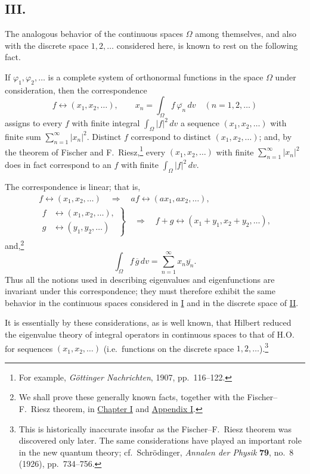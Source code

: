 ﻿\documentclass[paper=b5,fontsize=13pt,bookmarkpackage=false,twoside]{scrartcl}
\begin{document}
\subsection*{III.}\label{intro:III}

The analogous behavior of the continuous spaces $\Omega$ among themselves, and also with the discrete space $1,2,\ldots$ considered here, is known to rest on the following fact.

If $\varphi_1,\varphi_2,\ldots$ is a complete system of orthonormal functions in the space $\Omega$ under consideration, then the correspondence
\[
 f\longleftrightarrow(x_1,x_2,\ldots),
 \qquad
 x_n=\int_\Omega f\,\overline{\varphi_n}\,dv
 \quad(n=1,2,\ldots)
\]
assigns to every $f$ with finite integral $\int_\Omega|f|^2\,dv$ a sequence $(x_1,x_2,\ldots)$ with finite sum $\sum_{n=1}^{\infty}|x_n|^2$. Distinct $f$ correspond to distinct $(x_1,x_2,\ldots)$; and, by the theorem of Fischer and F.~Riesz,\footnote{\label{fn:source-8}For example, \emph{Göttinger Nachrichten}, 1907, pp.~116--122.} every $(x_1,x_2,\ldots)$ with finite $\sum_{n=1}^{\infty}|x_n|^2$ does in fact correspond to an $f$ with finite $\int_\Omega|f|^2\,dv$.

The correspondence is linear; that is,
\[
\begin{gathered}
 f\longleftrightarrow(x_1,x_2,\ldots)
 \quad\Longrightarrow\quad
 af\longleftrightarrow(ax_1,ax_2,\ldots),\\
 \left.
\begin{aligned}
 f&\longleftrightarrow(x_1,x_2,\ldots),\\
 g&\longleftrightarrow(y_1,y_2,\ldots)
\end{aligned}
\right\}
 \quad\Longrightarrow\quad
 f+g\longleftrightarrow(x_1+y_1,x_2+y_2,\ldots),
\end{gathered}
\]
and,\footnote{\label{fn:source-9}We shall prove these generally known facts, together with the Fischer--F.~Riesz theorem, in \hyperref[chap:I]{Chapter I} and \hyperref[app:I]{Appendix I}.}
\[
 \int_\Omega f\,\overline g\,dv
 =\sum_{n=1}^{\infty}x_n\overline{y_n}.
\]
Thus all the notions used in describing eigenvalues and eigenfunctions are invariant under this correspondence; they must therefore exhibit the same behavior in the continuous spaces considered in \hyperref[intro:I]{I} and in the discrete space of \hyperref[intro:II]{II}.

It is essentially by these considerations, as is well known, that Hilbert reduced the eigenvalue theory of integral operators in continuous spaces to that of H.O. for sequences $(x_1,x_2,\ldots)$ (i.e.\ functions on the discrete space $1,2,\ldots$).\footnote{\label{fn:source-10}This is historically inaccurate insofar as the Fischer--F.~Riesz theorem was discovered only later. The same considerations have played an important role in the new quantum theory; cf.\ Schrödinger, \emph{Annalen der Physik} \textbf{79}, no.~8 (1926), pp.~734--756.}
\end{document}
